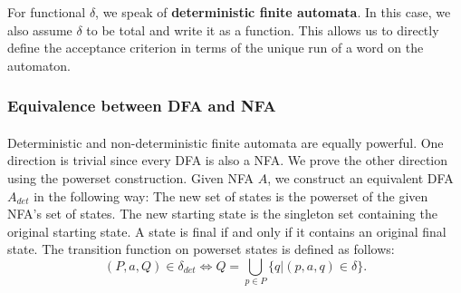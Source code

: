 \documentclass[11pt,a4paper,oneside]{book}
\begin{document}


                For functional $\delta$, we speak of \textbf{deterministic finite automata}. In this case, we also assume $\delta$ to be total and write it as a function. 
                This allows us to directly define the acceptance criterion in terms of the unique run of a word on the automaton. 


                \subsubsection{Equivalence between DFA and NFA}
                    \paragraph{} 
                        Deterministic and non-deterministic finite automata are equally powerful. 
                        One direction is trivial since every DFA is also a NFA. 
                        We prove the other direction using the powerset construction. 
                        Given NFA $A$, we construct an equivalent DFA $A_{det}$ in the following way:
                        The new set of states is the powerset of the given NFA's set of states. 
                        The new starting state is the singleton set containing the original starting state. 
                        A state is final if and only if it contains an original final state. 
                        The transition function on powerset states is defined as follows:
                        \[
                            (P, a, Q) \in \delta_{det} \Longleftrightarrow Q = \bigcup \limits _{p \in P} \{ q | (p,a,q) \in \delta \}.
                        \]


                    \vspace{-0.4cm}
                    \vspace{-0.4cm}
\end{document}
